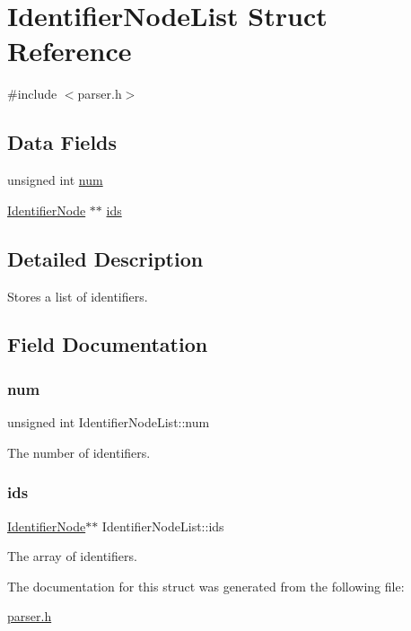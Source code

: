 \hypertarget{struct_identifier_node_list}{}\section{Identifier\+Node\+List Struct Reference}
\label{struct_identifier_node_list}


{\ttfamily \#include $<$parser.\+h$>$}

\subsection*{Data Fields}
\begin{DoxyCompactItemize}
\item 
unsigned int \hyperlink{struct_identifier_node_list_a7ee19db1c4e05eafe5df277542e01dd1}{num}
\item 
\hyperlink{parser_8h_a930727769b8a8eb0d24d474f3aa12a43}{Identifier\+Node} $\ast$$\ast$ \hyperlink{struct_identifier_node_list_a61b371619c07f89846ae0780d5403dc0}{ids}
\end{DoxyCompactItemize}


\subsection{Detailed Description}
Stores a list of identifiers. 

\subsection{Field Documentation}
\mbox{\label{struct_identifier_node_list_a7ee19db1c4e05eafe5df277542e01dd1}} 
\subsubsection{\texorpdfstring{num}{num}}
{\footnotesize\ttfamily unsigned int Identifier\+Node\+List\+::num}

The number of identifiers. \mbox{\label{struct_identifier_node_list_a61b371619c07f89846ae0780d5403dc0}} 
\subsubsection{\texorpdfstring{ids}{ids}}
{\footnotesize\ttfamily \hyperlink{parser_8h_a930727769b8a8eb0d24d474f3aa12a43}{Identifier\+Node}$\ast$$\ast$ Identifier\+Node\+List\+::ids}

The array of identifiers. 

The documentation for this struct was generated from the following file\+:\begin{DoxyCompactItemize}
\item 
\hyperlink{parser_8h}{parser.\+h}\end{DoxyCompactItemize}
